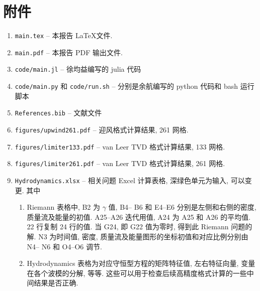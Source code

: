 \documentclass[10.5pt
]{article}
\begin{document}
\section{附件}

\begin{enumerate}

\item
\verb|main.tex|
-- 本报告 \LaTeX  文件.
\item
\verb|main.pdf|
-- 本报告 PDF 输出文件.
\item
\verb|code/main.jl|
--  徐均益编写的 julia 代码
\item
\verb|code/main.py| 和 
\verb|code/run.sh|
--  分别是余航编写的 python 代码和 bash 运行脚本
\item
\verb|References.bib|
--  文献文件
\item
\verb|figures/upwind261.pdf|
-- 迎风格式计算结果, 261 网格.
\item
\verb|figures/limiter133.pdf|
-- van Leer TVD 格式计算结果, 133 网格.
\item
\verb|figures/limiter261.pdf|
-- van Leer TVD 格式计算结果, 261 网格.
\item
\verb|Hydrodynamics.xlsx|
-- 相关问题 Excel 计算表格, 深绿色单元为输入, 可以变更. 其中

\begin{enumerate}
\item
  Riemann 表格中, B2 为 $\gamma$ 值, B4-- B6 和 E4--E6 分别是左侧和右侧的密度, 质量流及能量的初值. A25--A26 迭代用值, A24 为 A25 和 A26 的平均值.
  22 行复制 24 行的值. 当 G24, 即 G22 值为零时, 得到此 Riemann 问题的解. N3 为时间值, 密度, 质量流及能量图形的坐标初值和对应比例分别由 N4-- N6 和 O4--O6 调节.
\item
Hydrodynamics 表格为对应守恒型方程的矩阵特征值, 左右特征向量, 变量在各个波模的分解, 等等. 这些可以用于检查后续高精度格式计算的一些中间结果是否正确.
\end{enumerate}
\end{enumerate}



\end{document}
